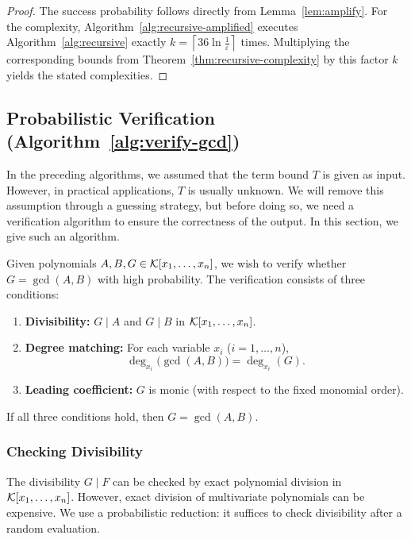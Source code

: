 \documentclass{article}
\numberwithin{equation}{section}
\begin{document}
\begin{proof}
The success probability follows directly from Lemma~\ref{lem:amplify}. For the complexity, Algorithm~\ref{alg:recursive-amplified} executes Algorithm~\ref{alg:recursive} exactly $k = \left\lceil 36 \ln\frac{1}{\varepsilon} \right\rceil$ times. Multiplying the corresponding bounds from Theorem~\ref{thm:recursive-complexity} by this factor $k$ yields the stated complexities.
\end{proof}



\subsection{Probabilistic Verification (Algorithm~\ref{alg:verify-gcd})}
\label{sec:verification}

In the preceding algorithms, we assumed that the term bound $T$ is given as input. However, in practical applications, $T$ is usually unknown. We will remove this assumption through a guessing strategy, but before doing so, we need a verification algorithm to ensure the correctness of the output. In this section, we give such an algorithm.



Given polynomials $A, B, G \in {\mathcal{K}}[x_1, \dots, x_n]$, we wish to verify whether $G = \gcd(A, B)$ with high probability. The verification consists of three conditions:

\begin{enumerate}
    \item \textbf{Divisibility:} $G \mid A$ and $G \mid B$ in ${\mathcal{K}}[x_1,\dots,x_n]$.
    \item \textbf{Degree matching:} For each variable $x_i$ ($i=1,\dots,n$),
    \[
    \deg_{x_i}\bigl(\gcd(A, B)\bigr) = \deg_{x_i}(G).
    \]
    \item \textbf{Leading coefficient:} $G$ is monic (with respect to the fixed monomial order).
\end{enumerate}

If all three conditions hold, then $G = \gcd(A, B)$.

\subsubsection*{Checking Divisibility}

The divisibility $G \mid F$ can be checked by exact polynomial division in ${\mathcal{K}}[x_1,\dots,x_n]$. However, exact division of multivariate polynomials can be expensive. We use a probabilistic reduction: it suffices to check divisibility after a random evaluation.
\end{document}
